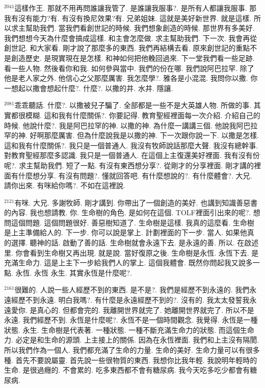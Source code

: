 \documentclass{book}
\begin{document}
$^{2041}$這樣作王.
那就不用再問誰讓我管了.
是誰讓我服事?.
是所有人都讓我服事.
那我有沒有能力?有.
有沒有換尼效果?有.
兄弟姐妹.
這就是美好新世界.
就是這樣.
所以求主幫助我們.
當我們看創世記的時候.
我們想象創造的時候.
那世界有多美好.
我們想想今天為什麼會搞成這樣.
和主會怎麼做.
求主幫助我們.
下一次.
我會再從創世記.
和大家看.
剛才說了那麼多的東西.
我們再結構去看.
原來創世記的重點不是創造歷史.
是現實現在是怎樣.
和神如何把他輓回過來.
下一堂我們看一些足跡.
看一些人物.
然後看你和我.
如何參與當中.
我們的份在哪.
我們說阿巴拉罕.
除了他是老人家之外.
他信心之父那麼厲害.
我怎麼學?.
雅各是小混混.
我問你以撒.
你一想起以撒會想起什麼?.
什麼?.
以撒的井.
水井.
隱讓.

$^{2081}$乖乖聽話.
什麼?.
以撒被兒子騙了.
全部都是一些不是大英雄人物.
所做的事.
其實都很模糊.
這和我有什麼關係?.
你要記得.
教育聖經裡面每一次介紹.
介紹自己的時候.
他說什麼?.
我是阿巴拉罕的神.
以撒的神.
為什麼一講講三個.
他說我阿巴拉罕的神.
好啊那麼厲害.
但為什麼說我是以撒的神.
下一次跟你說一下.
以撒是怎樣.
這和我有什麼關係?.
我只是一個普通人.
我沒有牧師說話那麼大聲.
我沒有總幹事.
對教育聖經那麼多認識.
我只是一個普通人.
在這個上主復還美好裡面.
我有沒有份呢?.
求主幫助我們.
短了一點.
有沒有東西想分享?.
從剛才的分享裡面.
剛才講的裡面有什麼想分享.
有沒有問題?.
懂就回答吧.
有什麼想說的?.
有什麼體會?.
大兄.
請你出來.
有咪給你嗎?.
不如在這裡說.

$^{2121}$有咪.
大兄.
多謝牧師.
剛才講到.
你帶出了一個創造的美好.
也講到知識善惡書的內容.
我也想請教.
你.
生命樹的角色.
是如何在這個.
TOLF裡面引出來的呢?.
想問這個問題.
這個問題很好.
善惡樹知道了.
生命樹是這樣.
我真的這麼看.
生命樹是上主準備給人的.
下一步.
你可以說是掌上.
計劃裡面的下一步.
當人.
如果他真的選擇.
聽神的話.
啟動了善的話.
生命樹就會永遠下去.
是永遠的善.
所以.
在啟述里.
你會看到生命樹又再出現.
就是說.
當好復原之後.
生命樹是永恆.
永恆下去.
是充滿生命力.
這是上主下一步給我們人的掌上.
這個我體會.
既然你問起我又說多一點.
永恆.
永恆 永生.
其實永恆是什麼呢?.

$^{2161}$很難的.
人說一些人經歷不到的東西.
是不是?.
我們是經歷不到永遠的.
我們永遠經歷不到永遠.
明白我嗎?.
有什麼是永遠經歷不到的?.
沒有的.
我太太發誓我永遠愛你.
是真心的.
但都會完的.
我離開世界就完了.
她離開世界就完了.
所以不是永遠.
我們經歷不到.
永恆是什麼呢?.
永恆不是一個時間觀念.
我覺得.
永恆是一種狀態.
永生.
生命樹是代表著.
一種狀態.
一種不斷充滿生命力的狀態.
而這個生命力.
必定是和生命的源頭.
上主接上的關係.
因為在永恆裡面.
我們和上主沒有隔閡.
所以我們作為一個人.
我們都充滿了生命的力量.
生命的美好.
生命力量可以有很多種.
首先不要說屬靈.
首先說一些很物質的東西.
我想你比我年輕.
我說明年輕時的生命.
是很過癮的.
不會累的.
吃多東西都不會有糖尿病.
我今天吃多吃少都會有糖尿病.
\end{document}
